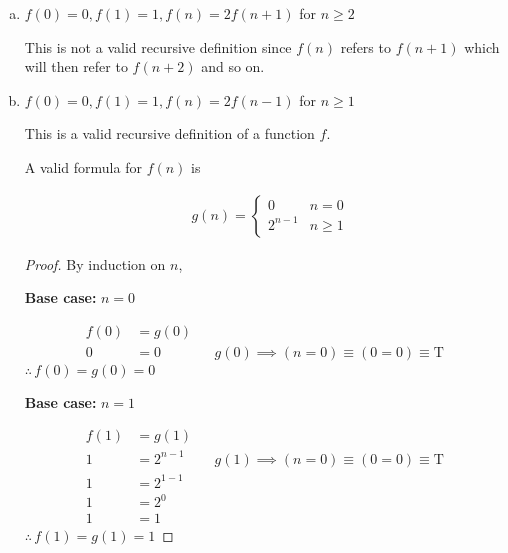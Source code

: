 \documentclass{homework}
\begin{document}
\begin{problem}{2}
\begin{enumerate}[(a)]
\begin{proof}
\textbf{Inductive step:} Suppose $f(n) = g(n)$ for $n > 1 \text{ and } (n \bmod 3) \neq 1$, we will show that:

\begin{align*}
f(n) &= g(n) && \text{for } n > 1 \text{ and } (n \bmod 3) \neq 1 \\
2f(n - 3) &= 2^{\left\lfloor (n-1)/3\right\rfloor +1} && \text{for } n > 1 \text{ and } (n \bmod 3) \neq 1
\end{align*}

Since,

\begin{align*}
2f(n - 3) &= 2^{\left\lfloor (n-1)/3\right\rfloor +1}
\end{align*}

$\therefore \, f(n) = g(n)$ for $n > 1 \text{ and } (n \bmod 3) \neq 1$.
\end{proof}



\item $f(0) = 0, f(1) = 1, f(n) = 2f(n + 1)$ for $n \geq 2$

This is not a valid recursive definition since $f(n)$ refers to $f(n + 1)$ which will then refer to $f(n + 2)$ and so on.



\item $f(0) = 0, f(1) = 1, f(n) = 2f(n - 1)$ for $n \geq 1$

This is a valid recursive definition of a function $f$.

A valid formula for $f(n)$ is

\begin{align*}
& g(n) =
  \begin{cases}
    0 & n = 0 \\
    2^{n-1} & n \geq 1
  \end{cases}
\end{align*}

\begin{proof}
By induction on $n$,

\textbf{Base case:} $n = 0$

\begin{align*}
f(0) &= g(0) \\
0 &= 0 && g(0) \implies (n = 0) \equiv (0 = 0) \equiv \text{T}
\end{align*}
$\therefore \, f(0) = g(0) = 0$

\textbf{Base case:} $n = 1$

\begin{align*}
f(1) &= g(1) \\
1 &= 2^{n-1} && g(1) \implies (n = 0) \equiv (0 = 0) \equiv \text{T} \\
1 &= 2^{1-1} \\
1 &= 2^{0} \\
1 &= 1
\end{align*}
$\therefore \, f(1) = g(1) = 1$


\end{proof}
\end{enumerate}
\end{problem}
\end{document}
